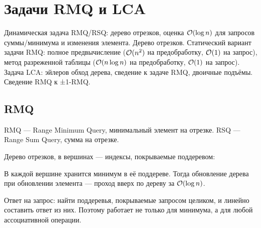 \section{Задачи RMQ и LCA}
Динамическая задача RMQ/RSQ:
дерево отрезков, оценка $\mathcal{O}(\log n)$
для запросов суммы/минимума
и изменения элемента.
Дерево отрезков.
Статический вариант задачи RMQ:
полное предвычисление
($\mathcal{O}(n^2)$ на предобработку, $\mathcal{O}(1)$ на запрос),
метод разреженной таблицы
($\mathcal{O}(n \log n)$ на предобработку, $\mathcal{O}(1)$ на запрос).
Задача LCA: эйлеров обход дерева,
сведение к задаче RMQ, двоичные подъёмы.
Сведение RMQ к ±1-RMQ.

\subsection{RMQ}
RMQ --- Range Minimum Query, минимальный элемент на отрезке.
RSQ --- Range Sum Query, сумма на отрезке.

Дерево отрезков, в вершинах --- индексы,
покрываемые поддеревом:

\begin{center}
\end{center}

В каждой вершине хранится минимум в её поддереве.
Тогда обновление дерева при обновлении элемента
--- проход вверх по дереву за $\mathcal{O}(\log n)$.

Ответ на запрос: найти поддеревья, покрываемые
запросом целиком, и линейно составить ответ из них.
Поэтому работает не только для минимума,
а для любой ассоциативной операции.

